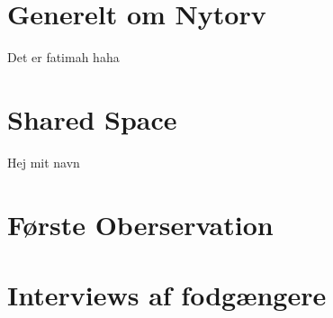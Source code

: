 \section{Generelt om Nytorv}
\label{sec:Generelt om Nytorv}
Det er fatimah haha
\section{Shared Space}
\label{sec:Shared Space}
Hej mit navn \cite {datasheet_pir1}
\section{Første Oberservation}
\label{sec:Første Oberservation}

\section{Interviews af fodgængere}
\label{sec:Interviews af fodgængere}
